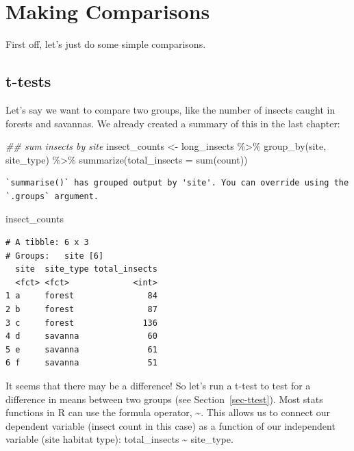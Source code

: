 \documentclass[
  letterpaper,
  DIV=11,
  numbers=noendperiod]{scrreprt}
\newenvironment{Shaded}{\begin{snugshade}}{\end{snugshade}}
\newcommand{\AttributeTok}[1]{\textcolor[rgb]{0.40,0.45,0.13}{#1}}
\newcommand{\DocumentationTok}[1]{\textcolor[rgb]{0.37,0.37,0.37}{\textit{#1}}}
\newcommand{\FunctionTok}[1]{\textcolor[rgb]{0.28,0.35,0.67}{#1}}
\newcommand{\NormalTok}[1]{\textcolor[rgb]{0.00,0.23,0.31}{#1}}
\newcommand{\OtherTok}[1]{\textcolor[rgb]{0.00,0.23,0.31}{#1}}
\newcommand{\SpecialCharTok}[1]{\textcolor[rgb]{0.37,0.37,0.37}{#1}}
\begin{document}
\hypertarget{making-comparisons}{%
\section{Making Comparisons}\label{making-comparisons}}

First off, let's just do some simple comparisons.

\hypertarget{t-tests}{%
\subsection{t-tests}\label{t-tests}}

Let's say we want to compare two groups, like the number of insects
caught in forests and savannas. We already created a summary of this in
the last chapter:

\begin{Shaded}
\begin{Highlighting}[]
\DocumentationTok{\#\# sum insects by site}
\NormalTok{insect\_counts }\OtherTok{\textless{}{-}}\NormalTok{ long\_insects }\SpecialCharTok{\%\textgreater{}\%}
  \FunctionTok{group\_by}\NormalTok{(site, site\_type) }\SpecialCharTok{\%\textgreater{}\%}
  \FunctionTok{summarize}\NormalTok{(}\AttributeTok{total\_insects =} \FunctionTok{sum}\NormalTok{(count))}
\end{Highlighting}
\end{Shaded}

\begin{verbatim}
`summarise()` has grouped output by 'site'. You can override using the
`.groups` argument.
\end{verbatim}

\begin{Shaded}
\begin{Highlighting}[]
\NormalTok{insect\_counts}
\end{Highlighting}
\end{Shaded}

\begin{verbatim}
# A tibble: 6 x 3
# Groups:   site [6]
  site  site_type total_insects
  <fct> <fct>             <int>
1 a     forest               84
2 b     forest               87
3 c     forest              136
4 d     savanna              60
5 e     savanna              61
6 f     savanna              51
\end{verbatim}

It seems that there may be a difference! So let's run a t-test to test
for a difference in means between two groups (see
Section~\ref{sec-ttest}). Most stats functions in R can use the formula
operator, \textasciitilde. This allows us to connect our dependent
variable (insect count in this case) as a function of our independent
variable (site habitat type): total\_insects \textasciitilde{}
site\_type.
\end{document}
